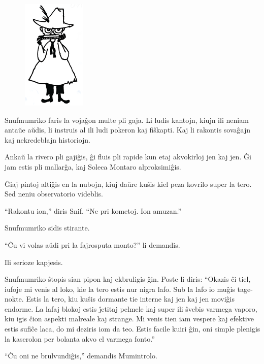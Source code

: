 \begin{figure}[htbp]
\centering
\includegraphics[width=86pt,height=150pt]{3-8.png}
\caption{}
\label{3-8}
\end{figure}

Snufmumriko faris la vojaĝon multe pli gaja. Li ludis kantojn, kiujn ili neniam antaŭe aŭdis, li instruis al ili ludi pokeron kaj fiŝkapti. Kaj li rakontis sovaĝajn kaj nekredeblajn historiojn.

Ankaŭ la rivero pli gajiĝis, ĝi fluis pli rapide kun etaj akvokirloj jen kaj jen. Ĝi jam estis pli mallarĝa, kaj Soleca Montaro alproksimiĝis.

Ĝiaj pintoj altiĝis en la nubojn, kiuj daŭre kuŝis kiel peza kovrilo super la tero. Sed neniu observatorio videblis.

``Rakontu ion,'' diris Snif. ``Ne pri kometoj. Ion amuzan.''

Snufmumriko sidis stirante.

``Ĉu vi volas aŭdi pri la fajrosputa monto?'' li demandis.

Ili serioze kapjesis.

Snufmumriko ŝtopis sian pipon kaj ekbruligis ĝin. Poste li diris: ``Okazis ĉi tiel, iufoje mi venis al loko, kie la tero estis nur nigra lafo. Sub la lafo io muĝis tage-nokte. Estis la tero, kiu kuŝis dormante tie interne kaj jen kaj jen moviĝis endorme. La lafaj blokoj estis ĵetitaj pelmele kaj super ili ŝvebis varmega vaporo, kiu igis ĉion aspekti malreale kaj strange. Mi venis tien iam vespere kaj efektive estis sufiĉe laca, do mi deziris iom da teo. Estis facile kuiri ĝin, oni simple plenigis la kaserolon per bolanta akvo el varmega fonto.''

``Ĉu oni ne brulvundiĝis,'' demandis Mumintrolo.

